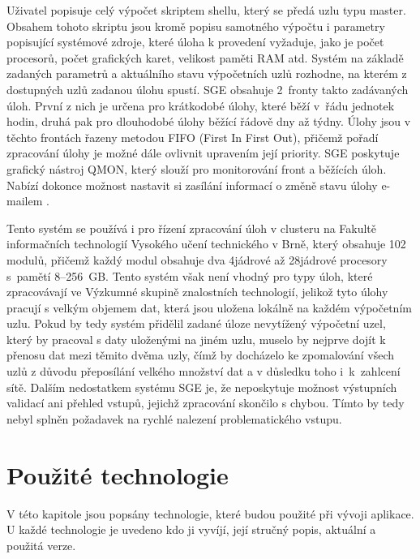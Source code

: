 Uživatel popisuje celý výpočet skriptem shellu, který se předá uzlu typu master. Obsahem tohoto skriptu jsou kromě popisu samotného výpočtu i parametry popisující systémové zdroje, které úloha k provedení vyžaduje, jako je počet procesorů, počet grafických karet, velikost paměti RAM atd. Systém na základě zadaných parametrů a aktuálního stavu výpočetních uzlů rozhodne, na kterém z dostupných uzlů zadanou úlohu spustí. SGE obsahuje 2~fronty takto zadávaných úloh. První z nich je určena pro krátkodobé úlohy, které běží v~řádu jednotek hodin, druhá pak pro dlouhodobé úlohy běžící řádově dny až týdny. Úlohy jsou v těchto frontách řazeny metodou FIFO (First In First Out), přičemž pořadí zpracování úlohy je možné dále ovlivnit upravením její priority. SGE poskytuje grafický nástroj QMON, který slouží pro monitorování front a běžících úloh. Nabízí dokonce možnost nastavit si zasílání informací o změně stavu úlohy e-mailem \cite{existTools_SGE}.

Tento systém se používá i pro řízení zpracování úloh v clusteru na Fakultě informačních technologií Vysokého učení technického v Brně, který obsahuje 102 modulů, přičemž každý modul obsahuje dva 4jádrové až 28jádrové procesory s~pamětí 8--256~GB. Tento systém však není vhodný pro typy úloh, které zpracovávají ve Výzkumné skupině znalostních technologií, jelikož tyto úlohy pracují s velkým objemem dat, která jsou uložena lokálně na každém výpočetním uzlu. Pokud by tedy systém přidělil zadané úloze nevytížený výpočetní uzel, který by pracoval s daty uloženými na jiném uzlu, muselo by nejprve dojít k přenosu dat mezi těmito dvěma uzly, čímž by docházelo ke zpomalování všech uzlů z důvodu přeposílání velkého množství dat a v důsledku toho i~k~zahlcení sítě. Dalším nedostatkem systému SGE je, že neposkytuje možnost výstupních validací ani přehled vstupů, jejichž zpracování skončilo s chybou. Tímto by tedy nebyl splněn požadavek na rychlé nalezení problematického vstupu.




\chapter{Použité technologie}
\label{chapter:used_technologies}

V této kapitole jsou popsány technologie, které budou použité při vývoji aplikace. U každé technologie je uvedeno kdo ji vyvíjí, její stručný popis, aktuální a použitá verze.

